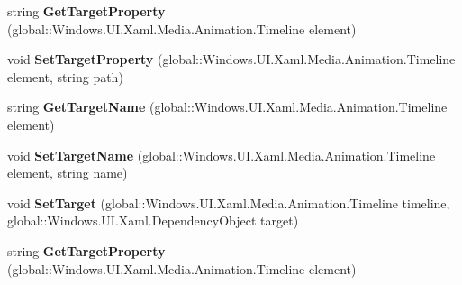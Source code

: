 \begin{DoxyCompactItemize}
\item 
\mbox{\label{interface_windows_1_1_u_i_1_1_xaml_1_1_media_1_1_animation_1_1_i_storyboard_statics_a62e7f08dda4730dc9bec8462837a7476}} 
string {\bfseries Get\+Target\+Property} (global\+::\+Windows.\+U\+I.\+Xaml.\+Media.\+Animation.\+Timeline element)
\item 
\mbox{\label{interface_windows_1_1_u_i_1_1_xaml_1_1_media_1_1_animation_1_1_i_storyboard_statics_ae3787739563318b3f3282dfec151be5c}} 
void {\bfseries Set\+Target\+Property} (global\+::\+Windows.\+U\+I.\+Xaml.\+Media.\+Animation.\+Timeline element, string path)
\item 
\mbox{\label{interface_windows_1_1_u_i_1_1_xaml_1_1_media_1_1_animation_1_1_i_storyboard_statics_afeb68a7d3fc61bb8fdbba68aab2f0d4f}} 
string {\bfseries Get\+Target\+Name} (global\+::\+Windows.\+U\+I.\+Xaml.\+Media.\+Animation.\+Timeline element)
\item 
\mbox{\label{interface_windows_1_1_u_i_1_1_xaml_1_1_media_1_1_animation_1_1_i_storyboard_statics_ad1745f5d472fa822ee6f34d92a55ae55}} 
void {\bfseries Set\+Target\+Name} (global\+::\+Windows.\+U\+I.\+Xaml.\+Media.\+Animation.\+Timeline element, string name)
\item 
\mbox{\label{interface_windows_1_1_u_i_1_1_xaml_1_1_media_1_1_animation_1_1_i_storyboard_statics_ab3c5f3b6891c82842a641da8d1254fdc}} 
void {\bfseries Set\+Target} (global\+::\+Windows.\+U\+I.\+Xaml.\+Media.\+Animation.\+Timeline timeline, global\+::\+Windows.\+U\+I.\+Xaml.\+Dependency\+Object target)
\item 
\mbox{\label{interface_windows_1_1_u_i_1_1_xaml_1_1_media_1_1_animation_1_1_i_storyboard_statics_a62e7f08dda4730dc9bec8462837a7476}} 
string {\bfseries Get\+Target\+Property} (global\+::\+Windows.\+U\+I.\+Xaml.\+Media.\+Animation.\+Timeline element)

\end{DoxyCompactItemize}
